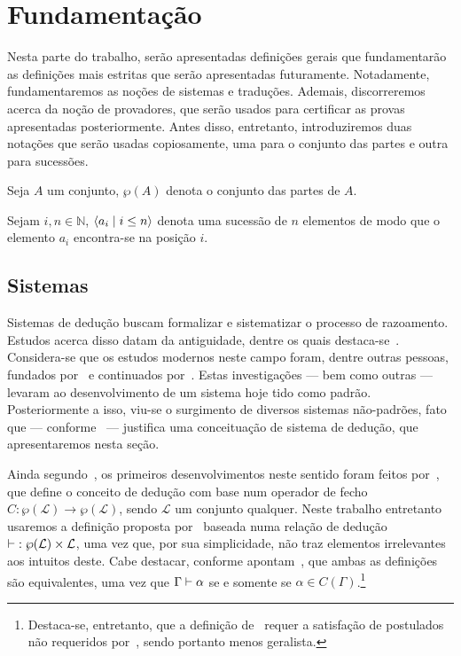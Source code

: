 \chapter{Fundamentação}

Nesta parte do trabalho, serão apresentadas definições gerais que fundamentarão as definições mais estritas que serão apresentadas futuramente. Notadamente, fundamentaremos as noções de sistemas e traduções. Ademais, discorreremos acerca da noção de provadores, que serão usados para certificar as provas apresentadas posteriormente. Antes disso, entretanto, introduziremos duas notações que serão usadas copiosamente, uma para o conjunto das partes e outra para sucessões.

\begin{notation}
    Seja $A$ um conjunto, $\wp(A)$ denota o conjunto das partes de $A$.
\end{notation}

\begin{notation}
    Sejam $i,n\in\mathbb{N}$, $\langle a_i\mid i\leq n\rangle$ denota uma sucessão de $n$ elementos de modo que o elemento $a_i$ encontra-se na posição $i$.
\end{notation}

\section{Sistemas}

Sistemas de dedução buscam formalizar e sistematizar o processo de razoamento. Estudos acerca disso datam da antiguidade, dentre os quais destaca-se~\cite{Aristotle}. Considera-se que os estudos modernos neste campo foram, dentre outras pessoas, fundados por~\cite{Frege} e continuados por~\cite{Russel-A,Russel-B,Russel-C}. Estas investigações --- bem como outras --- levaram ao desenvolvimento de um sistema hoje tido como padrão. Posteriormente a isso, viu-se o surgimento de diversos sistemas não-padrões, fato que --- conforme~\cite{Beziau-B} --- justifica uma conceituação de sistema de dedução, que apresentaremos nesta seção.

Ainda segundo~\cite{Beziau-B}, os primeiros desenvolvimentos neste sentido foram feitos por~\cite{Tarski}, que define o conceito de dedução com base num operador de fecho $C\mathrel{:}\wp(\mathcal{L})\to\wp(\mathcal{L})$, sendo $\mathcal{L}$ um conjunto qualquer. Neste trabalho entretanto usaremos a definição proposta por~\cite{Beziau} baseada numa relação de dedução $\mathalpha{\vdash}\mathrel{:}\wp(\mathcal{L})\times\mathcal{L}$, uma vez que, por sua simplicidade, não traz elementos irrelevantes aos intuitos deste. Cabe destacar, conforme apontam~\cite{Font}, que ambas as definições são equivalentes, uma vez que $\Gamma\mathrel{\vdash}\alpha$ se e somente se $\alpha\in C(\Gamma)$.\footnote{Destaca-se, entretanto, que a definição de~\cite{Tarski} requer a satisfação de postulados não requeridos por~\cite{Beziau}, sendo portanto menos geralista.}

